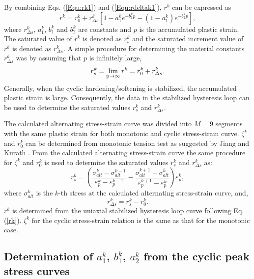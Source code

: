 By combining Eqs. (\ref{Equ:rk1}) and (\ref{Equ:rdeltak1}), $r^k$ can be expressed as
\begin{equation}\label{rk}
{r^k} = r_0^k + r_{\Delta s}^k\left[ {1 - a_1^k{e^{ - b_1^kp}} - (1-a_1^k){e^{ - b_2^kp}} }\right],
\end{equation}
where $r_{\Delta s}^k$, $a_1^k$, $b_1^k$ and $b_2^k$ are constants and $p$ is the accumulated plastic strain.
The saturated value of $r^k$ is denoted as $r^k_s$ and the saturated increment value of $r^k$ is denoted as $r^k_{\Delta s}$.
A simple procedure for determining the material constants $r_{\Delta s}^k$ was by assuming that $p$ is infinitely large,
\begin{equation}
r_s^k=\mathop {\lim }\limits_{{\rm{p}} \to \infty } {r^k} = r_0^k + r_{\Delta s}^k.
\label{Equ:rsk}
\end{equation}
Generally, when the cyclic hardening/softening is stabilized, the accumulated plastic strain is large.
Consequently, the data in the stabilized hysteresis loop can be used to determine the saturated values $r^k_s$ and $r^k_{\Delta s}$.

The calculated alternating stress-strain curve was  divided into $M=9$ segments with the same plastic strain for both monotonic and cyclic stress-strain curve.  $\zeta^k$ and $r_0^k$ can be determined from monotonic tension test as suggested by Jiang and Kurath \cite{Jiang1996387}. From the calculated alternating stress-strain curve the same procedure for $\zeta^k$ and $r_0^k$ is used to determine the saturated values $r^k_s$ and $r^k_{\Delta s}$ as:
\begin{equation}
r_{s}^k = \left( {\frac{{\sigma _{alt}^k - \sigma _{alt}^{k - 1}}}{{\varepsilon _p^k - \varepsilon _p^{k - 1}}} - \frac{{\sigma _{alt}^{k + 1} - \sigma _{alt}^k}}{{\varepsilon _p^{k + 1} - \varepsilon _p^k}}} \right)\varepsilon _p^k,
\end{equation}
where $\sigma _{alt}^k$ is the $k$-th stress at the calculated alternating stress-strain curve, and,
\begin{equation}
r_{\Delta s}^k = r_{s}^k - r_{0}^k.
\end{equation}
$r^k$ is determined from the uniaxial stabilized hysteresis loop curve following Eq. (\ref{rk}). ${\zeta ^k}$ for the cyclic stress-strain relation is the same as that for the monotonic case.

\subsection{Determination of $a_{1}^k$, $b_{1}^k$, $a_{2}^k$ from the cyclic peak stress curves}

